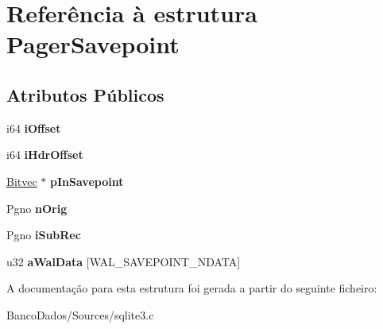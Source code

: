 \hypertarget{struct_pager_savepoint}{\section{Referência à estrutura Pager\-Savepoint}
\label{struct_pager_savepoint}
}
\subsection*{Atributos Públicos}
\begin{DoxyCompactItemize}
\item 
\hypertarget{struct_pager_savepoint_ab3ee7b75a10f47a82c8e3312bee6ad60}{i64 {\bfseries i\-Offset}}\label{struct_pager_savepoint_ab3ee7b75a10f47a82c8e3312bee6ad60}

\item 
\hypertarget{struct_pager_savepoint_ae1afd1cf4fba6f7efd232656366121d1}{i64 {\bfseries i\-Hdr\-Offset}}\label{struct_pager_savepoint_ae1afd1cf4fba6f7efd232656366121d1}

\item 
\hypertarget{struct_pager_savepoint_abf7d6dc9d457c866727f84c4b9e0348f}{\hyperlink{struct_bitvec}{Bitvec} $\ast$ {\bfseries p\-In\-Savepoint}}\label{struct_pager_savepoint_abf7d6dc9d457c866727f84c4b9e0348f}

\item 
\hypertarget{struct_pager_savepoint_a944cca2844a51bdba253476f516b9865}{Pgno {\bfseries n\-Orig}}\label{struct_pager_savepoint_a944cca2844a51bdba253476f516b9865}

\item 
\hypertarget{struct_pager_savepoint_ac1accce313b9da31631892e2cbe85a2f}{Pgno {\bfseries i\-Sub\-Rec}}\label{struct_pager_savepoint_ac1accce313b9da31631892e2cbe85a2f}

\item 
\hypertarget{struct_pager_savepoint_ac96cff844a24378c426a9901517f1d6c}{u32 {\bfseries a\-Wal\-Data} \mbox{[}W\-A\-L\-\_\-\-S\-A\-V\-E\-P\-O\-I\-N\-T\-\_\-\-N\-D\-A\-T\-A\mbox{]}}\label{struct_pager_savepoint_ac96cff844a24378c426a9901517f1d6c}

\end{DoxyCompactItemize}


A documentação para esta estrutura foi gerada a partir do seguinte ficheiro\-:\begin{DoxyCompactItemize}
\item 
Banco\-Dados/\-Sources/sqlite3.\-c\end{DoxyCompactItemize}
